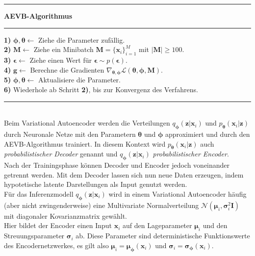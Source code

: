 \documentclass[12pt]{article}
\newcommand{\qenc}{q_{\boldsymbol\phi}(\mathbf{z}|\mathbf{x}_i)}
\newcommand{\pdec}{p_{\boldsymbol\theta}(\mathbf{x}_i|\mathbf{z})}
\begin{document}
	\hrule
	\vspace{0,15cm}
	\textbf{AEVB-Algorithmus}
	\vspace{0,05cm}
	\hrule
	\vspace{0,20cm}
	\textbf{1)}  $\boldsymbol\phi,\boldsymbol\theta \leftarrow$ Ziehe die Parameter zufällig.\\
	\textbf{2)} $\mathbf{M} \leftarrow$ Ziehe ein Minibatch $\textbf{M} = \{\textbf{x}_{i}\}_{i=1}^{M}$ mit $|\textbf{M}| \ge 100$. \\
	\textbf{3)} $\boldsymbol\epsilon \leftarrow$ Ziehe einen Wert für $\boldsymbol\epsilon \sim p(\boldsymbol\epsilon)$.\\
	\textbf{4)} $\mathbf{g} \leftarrow$ Berechne die Gradienten $\nabla_{\boldsymbol\theta,\boldsymbol\phi} \mathcal{L}(\boldsymbol\theta,\boldsymbol\phi,\textbf{M})$. \\
	\textbf{5)} $\boldsymbol\phi,\boldsymbol\theta \leftarrow$ Aktualisiere die Parameter.\\
	\textbf{6)} Wiederhole ab Schritt \textbf{2)}, bis zur Konvergenz des Verfahrens.
	\vspace{0,05cm}
	\hrule
	\vspace{0,3cm}
	\ \\
	Beim Variational Autoencoder werden die Verteilungen $\qenc$ und $\pdec$ durch Neuronale Netze mit den Parametern $\boldsymbol\theta$ und $\boldsymbol\phi$ approximiert und durch den AEVB-Algorithmus trainiert. In diesem Kontext wird $\pdec$ auch \emph{probabilistischer Decoder} genannt und $\qenc$ \emph{probabilistischer Encoder}. \\
	Nach der Trainingsphase können Decoder und Encoder jedoch voneinander getrennt werden. Mit dem Decoder lassen sich nun neue Daten erzeugen, indem hypotetische latente Darstellungen als Input genutzt werden.\\
	Für das Inferenzmodell $\qenc$ wird in einem Variational Autoencoder häufig (aber nicht zwingenderweise) eine Multivariate Normalverteilung $\mathcal{N}(\boldsymbol\mu_{i},\boldsymbol\sigma_{i}^{2}\mathbf{I})$ mit diagonaler Kovarianzmatrix gewählt. \\
	Hier bildet
	der Encoder einen Input $\textbf{x}_{i}$ auf den Lageparameter $\boldsymbol\mu_{i}$ und den Streuungsparameter $\boldsymbol\sigma_{i}$ ab. Diese Parameter sind deterministische Funktionswerte des Encodernetzwerkes, es gilt also $\boldsymbol\mu_{i} = \boldsymbol\mu_{\boldsymbol\phi}(\textbf{x}_{i})$ und $\boldsymbol\sigma_{i} = \boldsymbol\sigma_{\boldsymbol\phi}(\textbf{x}_{i})$.\\
\end{document}
